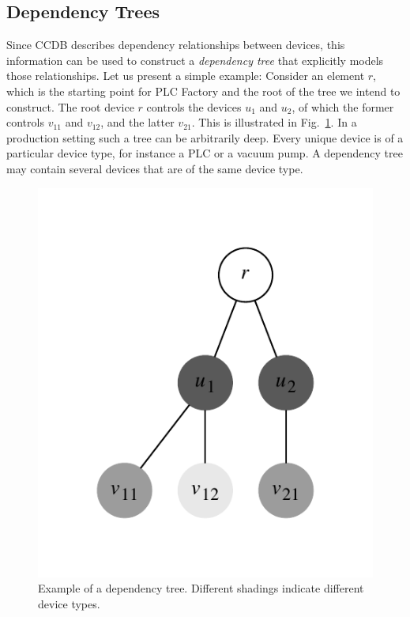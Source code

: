 \documentclass[a4paper,
              ]{jacow}
\begin{document}
\subsection{Dependency Trees}
Since CCDB describes dependency relationships between devices, this information can be used to construct a \emph{dependency tree} that explicitly models those relationships. Let us present a simple example: Consider an element $r$, which is the starting point for PLC Factory and the root of the tree we intend to construct. The root device $r$ controls the devices $u_1$ and $u_2$, of which the former controls $v_{11}$ and $v_{12}$, and the latter $v_{21}$. This is illustrated in Fig.\ \ref{fig:deviceTree}. In a production setting such a tree can be arbitrarily deep. Every unique device is of a particular device type, for instance a PLC or a vacuum pump. A dependency tree may contain several devices that are of the same device type.

\begin{figure}[h]
\centering
  \includegraphics[scale=0.9]{figures/deviceTree.pdf}
  \caption{Example of a dependency tree. Different shadings indicate different device types.}
  \label{fig:deviceTree}
\end{figure}
\end{document}
